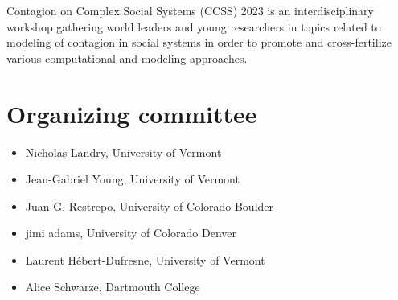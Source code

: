 Contagion on Complex Social Systems (CCSS) 2023 is an interdisciplinary workshop gathering world leaders and young researchers in topics related to modeling of contagion in social systems in order to promote and cross-fertilize various computational and modeling approaches.

\section{Organizing committee}

\begin{itemize}
    \item Nicholas Landry, University of Vermont
    \item Jean-Gabriel Young, University of Vermont
    \item Juan G. Restrepo, University of Colorado Boulder
    \item jimi adams, University of Colorado Denver
    \item Laurent Hébert-Dufresne, University of Vermont
    \item Alice Schwarze, Dartmouth College
\end{itemize}